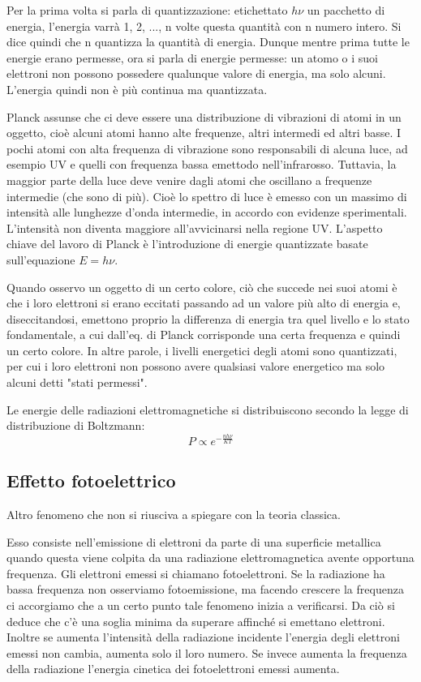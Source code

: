 Per la prima volta si parla di quantizzazione: etichettato $h\nu$ un pacchetto di energia, l'energia varrà 1, 2, ..., n volte questa quantità con n numero intero. Si dice quindi che n quantizza la quantità di energia.
Dunque mentre prima tutte le energie erano permesse, ora si parla di energie permesse: un atomo o i suoi elettroni non possono possedere qualunque valore di energia, ma solo alcuni. L'energia quindi non è più continua ma quantizzata.

Planck assunse che ci deve essere una distribuzione di vibrazioni di atomi in un oggetto, cioè alcuni atomi hanno alte frequenze, altri intermedi ed altri basse. I pochi atomi con alta frequenza di vibrazione sono responsabili di alcuna luce, ad esempio UV e quelli con frequenza bassa emettodo nell'infrarosso. Tuttavia, la maggior parte della luce deve venire dagli atomi che oscillano a frequenze intermedie (che sono di più). Cioè lo spettro di luce è emesso con un massimo di intensità alle lunghezze d'onda intermedie, in accordo con evidenze sperimentali. L'intensità non diventa maggiore all'avvicinarsi nella regione UV.
L'aspetto chiave del lavoro di Planck è l'introduzione di energie quantizzate basate sull'equazione $E=h\nu$.

Quando osservo un oggetto di un certo colore, ciò che succede nei suoi atomi è che i loro elettroni si erano eccitati passando ad un valore più alto di energia e, diseccitandosi, emettono proprio la differenza di energia tra quel livello e lo stato fondamentale, a cui dall'eq. di Planck corrisponde una certa frequenza e quindi un certo colore. In altre parole, i livelli energetici degli atomi sono quantizzati, per cui i loro elettroni non possono avere qualsiasi valore energetico ma solo alcuni detti "stati permessi".

Le energie delle radiazioni elettromagnetiche si distribuiscono secondo la legge di distribuzione di Boltzmann:
$$P\propto e^{{-\frac{nh\nu}{KT}}}$$
\subsection{Effetto fotoelettrico}
Altro fenomeno che non si riusciva a spiegare con la teoria classica.

Esso consiste nell'emissione di elettroni da parte di una superficie metallica quando questa viene colpita da una radiazione elettromagnetica avente opportuna frequenza. Gli elettroni emessi si chiamano fotoelettroni.
Se la radiazione ha bassa frequenza non osserviamo fotoemissione, ma facendo crescere la frequenza ci accorgiamo che a un certo punto tale fenomeno inizia a verificarsi. Da ciò si deduce che c'è una soglia minima da superare affinché si emettano elettroni. Inoltre se aumenta l'intensità della radiazione incidente l'energia degli elettroni emessi non cambia, aumenta solo il loro numero. Se invece aumenta la frequenza della radiazione l'energia cinetica dei fotoelettroni emessi aumenta.

